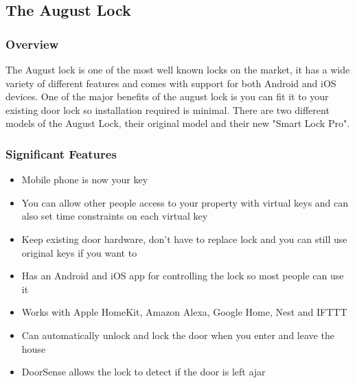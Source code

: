 \subsection{The August Lock}
\subsubsection{Overview}
The August lock is one of the most well known locks on the market, it has a wide variety of different features and comes with support for both Android and iOS devices. One of the major benefits of the august lock is you can fit it to your existing door lock so installation required is minimal. There are two different models of the August Lock, their original model and their new "Smart Lock Pro".

\subsubsection*{Significant Features}
\begin{itemize}
	\item Mobile phone is now your key
	\item You can allow other people access to your property with virtual keys and can also set time constraints on each virtual key
	\item Keep existing door hardware, don't have to replace lock and you can still use original keys if you want to
	\item Has an Android and iOS app for controlling the lock so most people can use it
	\item Works with Apple HomeKit, Amazon Alexa, Google Home, Nest and IFTTT
	\item Can automatically unlock and lock the door when you enter and leave the house
	\item DoorSense allows the lock to detect if the door is left ajar
\end{itemize}

